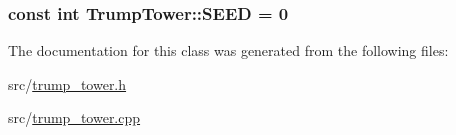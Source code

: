 \subsubsection[{\texorpdfstring{S\+E\+ED}{SEED}}]{\setlength{\rightskip}{0pt plus 5cm}const int Trump\+Tower\+::\+S\+E\+ED = 0\hspace{0.3cm}{\ttfamily [static]}}\hypertarget{classTrumpTower_a7207ac5ab137b0fc2ff175eec3592fec}{}\label{classTrumpTower_a7207ac5ab137b0fc2ff175eec3592fec}


The documentation for this class was generated from the following files\+:\begin{DoxyCompactItemize}
\item 
src/\hyperlink{trump__tower_8h}{trump\+\_\+tower.\+h}\item 
src/\hyperlink{trump__tower_8cpp}{trump\+\_\+tower.\+cpp}\end{DoxyCompactItemize}
